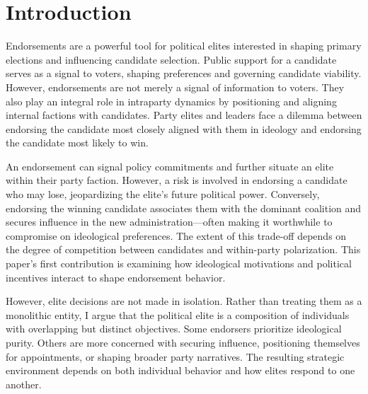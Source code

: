 \section{Introduction}
Endorsements are a powerful tool for political elites interested in shaping primary elections and influencing candidate selection. Public support for a candidate serves as a signal to voters, shaping preferences and governing candidate viability. However, endorsements are not merely a signal of information to voters. They also play an integral role in intraparty dynamics by positioning and aligning internal factions with candidates. Party elites and leaders face a dilemma between endorsing the candidate most closely aligned with them in ideology and endorsing the candidate most likely to win.

An endorsement can signal policy commitments and further situate an elite within their party faction. However, a risk is involved in endorsing a candidate who may lose, jeopardizing the elite’s future political power. Conversely, endorsing the winning candidate associates them with the dominant coalition and secures influence in the new administration—often making it worthwhile to compromise on ideological preferences. The extent of this trade-off depends on the degree of competition between candidates and within-party polarization. This paper's first contribution is examining how ideological motivations and political incentives interact to shape endorsement behavior.

However, elite decisions are not made in isolation. Rather than treating them as a monolithic entity, I argue that the political elite is a composition of individuals with overlapping but distinct objectives. Some endorsers prioritize ideological purity. Others are more concerned with securing influence, positioning themselves for appointments, or shaping broader party narratives. The resulting strategic environment depends on both individual behavior and how elites respond to one another.

